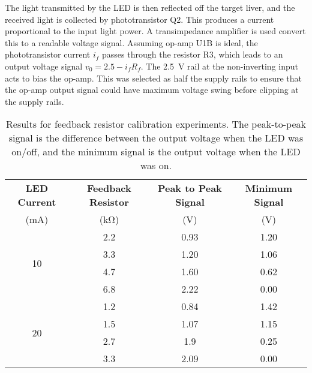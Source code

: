 The light transmitted by the LED is then reflected off the target liver, and the received light is collected by phototransistor Q2. This produces a current proportional to the input light power. A transimpedance amplifier is used convert this to a readable voltage signal. Assuming op-amp U1B is ideal, the phototransistor current $i_f$ passes through the resistor R3, which leads to an output voltage signal $v_0 = 2.5 - i_f R_f$. The \SI{2.5}{\volt} rail at the non-inverting input acts to bias the op-amp. This was selected as half the supply rails to ensure that the op-amp output signal could have maximum voltage swing before clipping at the supply rails.\\

\begin{table}[htb]
	\centering
	\caption{Results for feedback resistor calibration experiments. The peak-to-peak signal is the difference between the output voltage when the LED was on/off, and the minimum signal is the output voltage when the LED was on.}
	\label{tab: tia feedback resistor}
	\begin{tabular}{|c|c|c|c|}
		\hline
		\textbf{LED Current} & \textbf{Feedback Resistor} & \textbf{Peak to Peak Signal} & \textbf{Minimum Signal}\\
		(mA)	&	(\si{\kilo\ohm})	&	(V)	&	(V)\\
		\hline
		\multirow{4}{*}{10}	&	2.2	&	0.93	&	1.20\\
						\cline{2-4}
						&	3.3	&	1.20	&	1.06\\
						\cline{2-4}
						&	4.7	&	1.60	&	0.62\\
						\cline{2-4}
						&	6.8	&	2.22	&	0.00\\
		\hline
		\multirow{4}{*}{20}	&	1.2	&	0.84	&	1.42\\
						\cline{2-4}
						&	1.5	&	1.07	&	1.15\\
						\cline{2-4}
						&	2.7	&	1.9	&	0.25\\
						\cline{2-4}
						&	3.3	&	2.09	&	0.00\\
		\hline
	\end{tabular}
\end{table}

